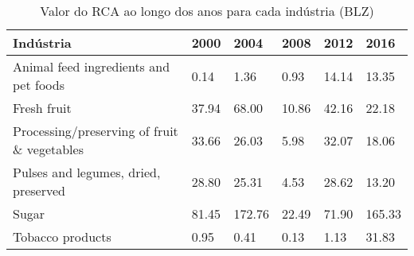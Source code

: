 \begin{table}
\centering
\caption{Valor do RCA ao longo dos anos para cada indústria (BLZ)}
\begin{tabular}{p{6cm}p{1.5cm}p{1.5cm}p{1.5cm}p{1.5cm}p{1.5cm}}
\toprule
                                  Indústria &  2000 &   2004 &  2008 &  2012 &   2016 \\
\midrule
      Animal feed ingredients and pet foods &  0.14 &   1.36 &  0.93 & 14.14 &  13.35 \\
                                Fresh fruit & 37.94 &  68.00 & 10.86 & 42.16 &  22.18 \\
Processing/preserving of fruit \& vegetables & 33.66 &  26.03 &  5.98 & 32.07 &  18.06 \\
       Pulses and legumes, dried, preserved & 28.80 &  25.31 &  4.53 & 28.62 &  13.20 \\
                                      Sugar & 81.45 & 172.76 & 22.49 & 71.90 & 165.33 \\
                           Tobacco products &  0.95 &   0.41 &  0.13 &  1.13 &  31.83 \\
\bottomrule
\end{tabular}
\end{table}
